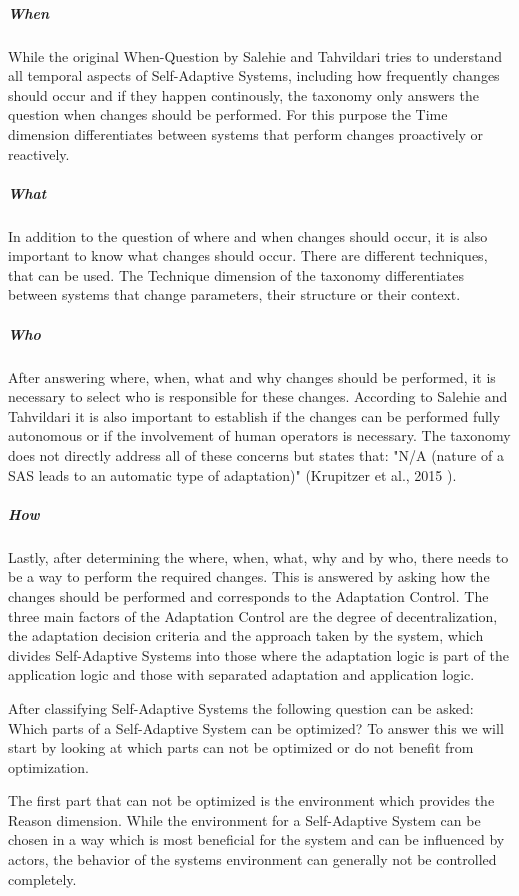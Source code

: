 \subparagraph*{When}
While the original When-Question by Salehie and Tahvildari tries to understand all temporal aspects of Self-Adaptive Systems,
including how frequently changes should occur and if they happen continously,
the taxonomy only answers the question when changes should be performed.
For this purpose the Time dimension differentiates between systems that perform changes proactively or reactively.

\subparagraph*{What}
In addition to the question of where and when changes should occur, it is also important to know
what changes should occur. There are different techniques, that can be used.
The Technique dimension of the taxonomy differentiates between systems that change parameters, their structure or their context.

\subparagraph*{Who}
After answering where, when, what and why changes should be performed, 
it is necessary to select who is responsible for these changes.
According to Salehie and Tahvildari it is also important to establish if the changes can be performed fully autonomous
or if the involvement of human operators is necessary.
The taxonomy does not directly address all of these concerns but states that:
"N/A (nature of a SAS leads to an automatic type of adaptation)" (Krupitzer et al., 2015 \cite{SurveyOnEngineeringApproaches}).

\subparagraph*{How}
Lastly, after determining the where, when, what, why and by who, there needs to be a way
to perform the required changes. This is answered by asking how the changes should be performed
and corresponds to the Adaptation Control.
The three main factors of the Adaptation Control are the degree of decentralization, the adaptation decision criteria
and the approach taken by the system, which divides Self-Adaptive Systems into those where the adaptation logic is part of the application logic
and those with separated adaptation and application logic.
\newline
\par


After classifying Self-Adaptive Systems the following question can be asked: Which parts of a Self-Adaptive System can be optimized?
To answer this we will start by looking at which parts can not be optimized or do not benefit from optimization.
\newline
\par

The first part that can not be optimized is the environment which provides the Reason dimension.
While the environment for a Self-Adaptive System can be chosen in a way which is most beneficial for the system
and can be influenced by actors,
the behavior of the systems environment can generally not be controlled completely.
\newline
\par

